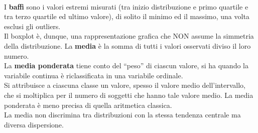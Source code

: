\documentclass[drafts, 10pt]{book}
\begin{document}
\\
I \textbf{baffi} sono i valori estremi misurati (tra inizio distribuzione e primo quartile e tra terzo quartile ed ultimo valore), di solito il minimo ed il massimo, una volta esclusi gli outliers.
\\
Il boxplot è, dunque, una rappresentazione grafica che NON assume la simmetria della distribuzione.
La \textbf{media} è la somma di tutti i valori osservati diviso il loro numero.
\\
La \textbf{media ponderata} tiene conto del “peso” di ciascun valore, si ha quando la variabile continua è riclassificata in una variabile ordinale.
\\
Si attribuisce a ciascuna classe un valore, spesso il valore medio dell’intervallo, che si moltiplica per il numero di soggetti che hanno tale valore medio. La media ponderata è meno precisa di quella aritmetica classica.
\\
La media non discrimina tra distribuzioni con la stessa tendenza centrale ma diversa dispersione.
\end{document}
